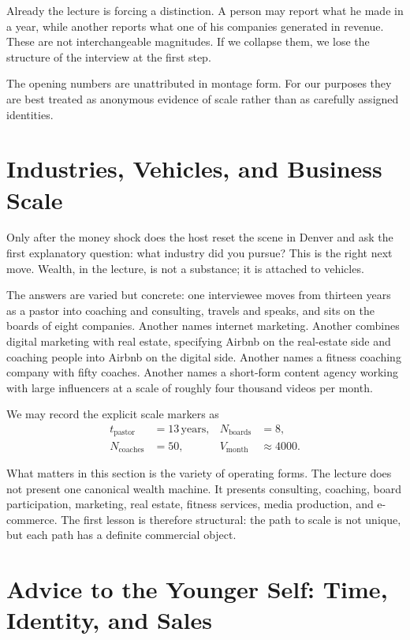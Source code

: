Already the lecture is forcing a distinction. A person may report what he made in a year, while another reports what one of his companies generated in revenue. These are not interchangeable magnitudes. If we collapse them, we lose the structure of the interview at the first step.

\begin{remark}
The opening numbers are unattributed in montage form. For our purposes they are best treated as anonymous evidence of scale rather than as carefully assigned identities.
\end{remark}

\section{Industries, Vehicles, and Business Scale}

Only after the money shock does the host reset the scene in Denver and ask the first explanatory question: what industry did you pursue? This is the right next move. Wealth, in the lecture, is not a substance; it is attached to vehicles.

The answers are varied but concrete: one interviewee moves from thirteen years as a pastor into coaching and consulting, travels and speaks, and sits on the boards of eight companies. Another names internet marketing. Another combines digital marketing with real estate, specifying Airbnb on the real-estate side and coaching people into Airbnb on the digital side. Another names a fitness coaching company with fifty coaches. Another names a short-form content agency working with large influencers at a scale of roughly four thousand videos per month.

We may record the explicit scale markers as
\begin{align}
t_{\mathrm{pastor}} &= 13\,\mathrm{years}, &
N_{\mathrm{boards}} &= 8, \\
N_{\mathrm{coaches}} &= 50, &
V_{\mathrm{month}} &\approx 4000.
\end{align}

What matters in this section is the variety of operating forms. The lecture does not present one canonical wealth machine. It presents consulting, coaching, board participation, marketing, real estate, fitness services, media production, and e-commerce. The first lesson is therefore structural: the path to scale is not unique, but each path has a definite commercial object.

\section{Advice to the Younger Self: Time, Identity, and Sales}

